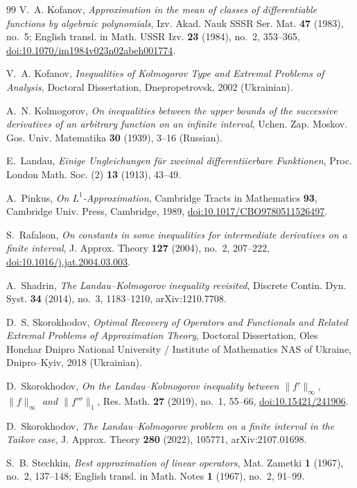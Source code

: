 \documentclass[11pt,a4paper]{article}
\theoremstyle{remark}
\numberwithin{equation}{section}
\begin{document}
\begin{thebibliography}{99}
V.~A. Kofanov,
\emph{Approximation in the mean of classes of differentiable functions by algebraic polynomials},
Izv. Akad. Nauk SSSR Ser. Mat. \textbf{47} (1983), no.~5; English transl. in Math. USSR Izv. \textbf{23} (1984), no.~2, 353--365, \href{https://doi.org/10.1070/im1984v023n02abeh001774}{doi:10.1070/im1984v023n02abeh001774}.

V.~A. Kofanov,
\emph{Inequalities of Kolmogorov Type and Extremal Problems of Analysis},
Doctoral Dissertation, Dnepropetrovsk, 2002 (Ukrainian).

A.~N. Kolmogorov,
\emph{On inequalities between the upper bounds of the successive derivatives of an arbitrary function on an infinite interval},
Uchen. Zap. Moskov. Gos. Univ. Matematika \textbf{30} (1939), 3--16 (Russian).

E.~Landau,
\emph{Einige Ungleichungen f\"ur zweimal differentiierbare Funktionen},
Proc. London Math. Soc. (2) \textbf{13} (1913), 43--49.

A.~Pinkus,
\emph{On $L^1$-Approximation},
Cambridge Tracts in Mathematics \textbf{93}, Cambridge Univ. Press, Cambridge, 1989, \href{https://doi.org/10.1017/CBO9780511526497}{doi:10.1017/CBO9780511526497}.

S.~Rafalson,
\emph{On constants in some inequalities for intermediate derivatives on a finite interval},
J. Approx. Theory \textbf{127} (2004), no.~2, 207--222, \href{https://doi.org/10.1016/j.jat.2004.03.003}{doi:10.1016/j.jat.2004.03.003}.

A.~Shadrin,
\emph{The Landau--Kolmogorov inequality revisited},
Discrete Contin. Dyn. Syst. \textbf{34} (2014), no.~3, 1183--1210, arXiv:1210.7708.

D.~S. Skorokhodov,
\emph{Optimal Recovery of Operators and Functionals and Related Extremal Problems of Approximation Theory},
Doctoral Dissertation, Oles Honchar Dnipro National University / Institute of Mathematics NAS of Ukraine, Dnipro--Kyiv, 2018 (Ukrainian).

D.~Skorokhodov,
\emph{On the Landau--Kolmogorov inequality between $\|f'\|_\infty$, $\|f\|_\infty$ and $\|f'''\|_1$},
Res. Math. \textbf{27} (2019), no.~1, 55--66, \href{https://doi.org/10.15421/241906}{doi:10.15421/241906}.

D.~Skorokhodov,
\emph{The Landau--Kolmogorov problem on a finite interval in the Taikov case},
J. Approx. Theory \textbf{280} (2022), 105771, arXiv:2107.01698.

S.~B. Stechkin,
\emph{Best approximation of linear operators},
Mat. Zametki \textbf{1} (1967), no.~2, 137--148; English transl. in Math. Notes \textbf{1} (1967), no.~2, 91--99.

\end{thebibliography}
\end{document}
